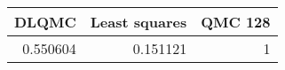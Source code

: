 \begin{tabular}{rrr}
\toprule
    DLQMC &   Least squares &   QMC 128 \\
\midrule
 0.550604 &        0.151121 &         1 \\
\bottomrule
\end{tabular}
